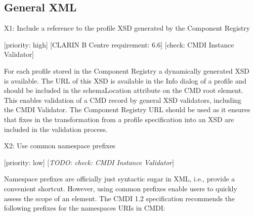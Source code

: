 \subsection{General XML}\label{general-xml}

X1: Include a reference to the profile XSD generated by the Component
Registry

{[}priority: high{]} {[}CLARIN B Centre requirement: 6.6{]} {[}check:
CMDI Instance Validator{]}

For each profile stored in the Component Registry a dynamically
generated XSD is available. The URL of this XSD is available in the Info
dialog of a profile and should be included in the schemaLocation
attribute on the CMD root element. This enables validation of a CMD
record by general XSD validators, including the CMDI Validator. The
Component Registry URL should be used as it ensures that fixes in the
transformation from a profile specification into an XSD are included in
the validation process.

X2: Use common namespace prefixes

{[}priority: low{]} {[}\emph{TODO: check: CMDI Instance Validator}{]}

Namespace prefixes are officially just syntactic sugar in XML, i.e.,
provide a convenient shortcut. However, using common prefixes enable
users to quickly assess the scope of an element. The CMDI 1.2
specification recommends the following prefixes for the namespaces URIs
in CMDI:

